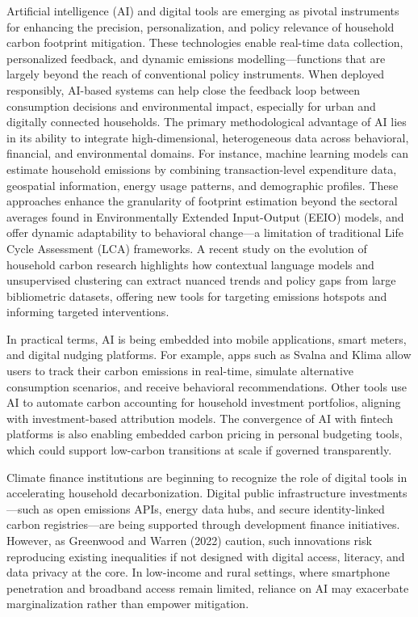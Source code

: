 \documentclass[12pt,a4paper]{article}%
\begin{document}
Artificial intelligence (AI) and digital tools are emerging as pivotal instruments for enhancing the precision, personalization, and policy relevance of household carbon footprint mitigation. These technologies enable real-time data collection, personalized feedback, and dynamic emissions modelling—functions that are largely beyond the reach of conventional policy instruments. When deployed responsibly, AI-based systems can help close the feedback loop between consumption decisions and environmental impact, especially for urban and digitally connected households.
The primary methodological advantage of AI lies in its ability to integrate high-dimensional, heterogeneous data across behavioral, financial, and environmental domains. For instance, machine learning models can estimate household emissions by combining transaction-level expenditure data, geospatial information, energy usage patterns, and demographic profiles. These approaches enhance the granularity of footprint estimation beyond the sectoral averages found in Environmentally Extended Input-Output (EEIO) models, and offer dynamic adaptability to behavioral change—a limitation of traditional Life Cycle Assessment (LCA) frameworks. A recent study on the evolution of household carbon research highlights how contextual language models and unsupervised clustering can extract nuanced trends and policy gaps from large bibliometric datasets, offering new tools for targeting emissions hotspots and informing targeted interventions.


In practical terms, AI is being embedded into mobile applications, smart meters, and digital nudging platforms. For example, apps such as Svalna and Klima allow users to track their carbon emissions in real-time, simulate alternative consumption scenarios, and receive behavioral recommendations. Other tools use AI to automate carbon accounting for household investment portfolios, aligning with investment-based attribution models. The convergence of AI with fintech platforms is also enabling embedded carbon pricing in personal budgeting tools, which could support low-carbon transitions at scale if governed transparently.

Climate finance institutions are beginning to recognize the role of digital tools in accelerating household decarbonization. Digital public infrastructure investments—such as open emissions APIs, energy data hubs, and secure identity-linked carbon registries—are being supported through development finance initiatives. However, as Greenwood and Warren (2022) caution, such innovations risk reproducing existing inequalities if not designed with digital access, literacy, and data privacy at the core. In low-income and rural settings, where smartphone penetration and broadband access remain limited, reliance on AI may exacerbate marginalization rather than empower mitigation.
\end{document}
